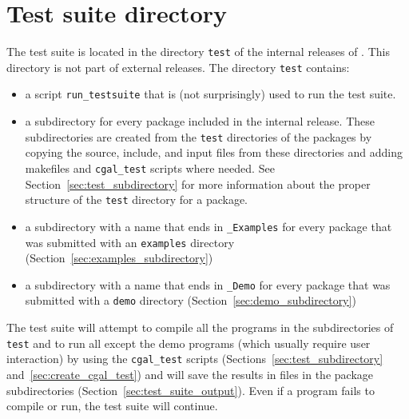 \section{Test suite directory}
\label{sec:test_suite_directory}

The test suite is located in the directory {\tt test} of the internal 
releases of \cgal. This directory is not part of external releases. The 
directory {\tt test} 
contains:
\begin{itemize}
   \item a script {\tt run\_testsuite}
         that is (not surprisingly) used to run the test suite.
   \item a subdirectory for every package included in the internal release.
         These subdirectories are created from the {\tt test} directories
         of the packages by copying the source, include, and input files from 
         these directories and adding makefiles and {\tt cgal\_test} scripts 
         where needed.  See Section~\ref{sec:test_subdirectory} for more
         information about the proper structure of the {\tt test} directory
         for a package.
   \item a subdirectory with a name that ends in {\tt \_Examples} for every 
         package that was submitted with an {\tt examples} directory 
         (Section~\ref{sec:examples_subdirectory})
   \item a subdirectory with a name that ends in {\tt \_Demo} for every
         package that was submitted with a {\tt demo} directory
         (Section~\ref{sec:demo_subdirectory})
\end{itemize}

The test suite will attempt to compile all the programs in the
subdirectories of {\tt test} and to run all except
the demo programs (which usually require user interaction) by using the 
{\tt cgal\_test} scripts 
(Sections~\ref{sec:test_subdirectory} and~\ref{sec:create_cgal_test})
and will save the results in files in the package subdirectories
(Section~\ref{sec:test_suite_output}). 
Even if a program fails to compile or run, the test suite will continue.


